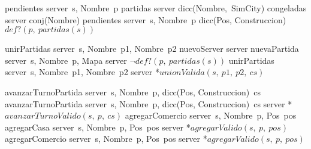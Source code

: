 \begin{tad}{}
    
\vspace{3mm}
    \tadObservadores
        \tadAlinearFunciones
            {pendientes}
            {server\ s, Nombre\ p}
        \tadOperacion
            {partidas}
            {server}
            {dicc(Nombre,\ SimCity)}
            {}
        \tadOperacion
            {congeladas}
            {server}
            {conj(Nombre)}
            {}
        \tadOperacion
            {pendientes}
            {server\ s, Nombre\ p}
            {dicc(Pos, Construccion)}
            {$def?(p,\ partidas(s))$}
            
\vspace{3mm}
    \tadGeneradores
    \tadAlinearFunciones
    {unirPartidas}
    {server\ s, Nombre\ p1, Nombre\ p2}
        \tadOperacion
            {nuevoServer}
            {}
            {server}
            {}
        \tadOperacion
            {nuevaPartida}
            {server\ s, Nombre\ p, Mapa}
            {server}
            {$\neg def?(p,\ partidas(s))$}
        \tadOperacion
            {unirPartidas}
            {server\ s, Nombre\ p1, Nombre\ p2}
            {server}
            {*$unionValida(s,\ p1,\ p2,\ cs)$}

    \tadAlinearFunciones
    {avanzarTurnoPartida}
    {server\ s, Nombre\ p, dicc(Pos, Construccion)\ cs}
        \tadOperacion
            {avanzarTurnoPartida}
            {server\ s, Nombre\ p, dicc(Pos, Construccion)\ cs}
            {server}
            {*$avanzarTurnoValido(s,\ p,\ cs)$} 
    \tadAlinearFunciones
    {agregarComercio}
    {server\ s, Nombre\ p, Pos\ pos}
        \tadOperacion
            {agregarCasa}
            {server\ s, Nombre\ p, Pos\ pos}
            {server}
            {*$agregarValido(s,\ p,\ pos)$}
        \tadOperacion
            {agregarComercio}
            {server\ s, Nombre\ p, Pos\ pos}
            {server}
            {*$agregarValido(s,\ p,\ pos)$}
       

\end{tad}
